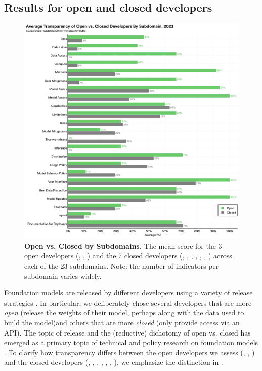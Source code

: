 \hypertarget{release-results}{\subsection{Results for open and closed developers}} \label{sec:release-results}
\begin{figure}
\centering
\includegraphics[keepaspectratio, height=\textheight, width=\textwidth]{figures/f13}
\caption{\textbf{Open vs. Closed by Subdomains.} 
The mean score for the 3 open developers (\meta, \huggingface, \stability) and the 7 closed developers (\openai, \anthropic, \google, \cohere, \aitwentyone, \inflection, \amazon) across each of the 23 subdomains. Note: the number of indicators per subdomain varies widely.
}
\label{fig:open-closed}
\end{figure}


Foundation models are released by different developers using a variety of release strategies \citep{liang2022community-norms, solaiman2023gradient}.
In particular, we deliberately chose several developers that are more \textit{open} (\eg release the weights of their model, perhaps along with the data used to build the model)and others that are more \textit{closed} (\eg only provide access via an API).
The topic of release and the (reductive) dichotomy of open vs. closed has emerged as a primary topic of technical and policy research on foundation models \citep{solaiman2019release, sastry2021release, shevlane2022structured, liang2022community-norms, liang2022condemning, solaiman2023gradient, widder2023open, seger2023open}.
To clarify how transparency differs between the open developers we assess (\ie \meta, \huggingface, \stability) and the closed developers (\ie \openai, \google, \anthropic, \cohere, \aitwentyone, \inflection, \amazon), we emphasize the distinction in . 

